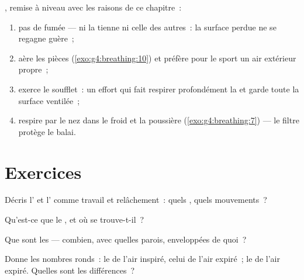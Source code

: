 \begin{method}\label{met:g7:lungs-and-gas-exchange:keep}
, remise à niveau avec les raisons de ce
chapitre~:
\begin{enumerate}
  \item pas de fumée --- ni la tienne ni celle des autres~: la
        surface perdue ne se regagne guère~;
  \item aère les pièces (\cref{exo:g4:breathing:10}) et préfère
        pour le sport un air extérieur propre~;
  \item exerce le soufflet~: un effort qui fait respirer
        profondément  la  et garde toute la
        surface ventilée~;
  \item respire par le nez dans le froid et la poussière
        (\cref{exo:g4:breathing:7}) --- le filtre protège le balai.
\end{enumerate}
\end{method}

\section{Exercices}

\begin{exercise}[$\star$]\label{exo:g7:lungs-and-gas-exchange:1}
Décris l' et l' comme travail et
relâchement~: quels , quels mouvements~?
\end{exercise}

\begin{exercise}[$\star$]\label{exo:g7:lungs-and-gas-exchange:2}
Qu'est-ce que le , et où se trouve-t-il~?
\end{exercise}

\begin{exercise}[$\star$]\label{exo:g7:lungs-and-gas-exchange:3}
Que sont les  --- combien, avec quelles parois, enveloppées
de quoi~?
\end{exercise}

\begin{exercise}[$\star$]\label{exo:g7:lungs-and-gas-exchange:4}
Donne les nombres ronds~: le  de l'air inspiré, celui de
l'air expiré~; le  de l'air expiré. Quelles sont
les différences~?
\end{exercise}

